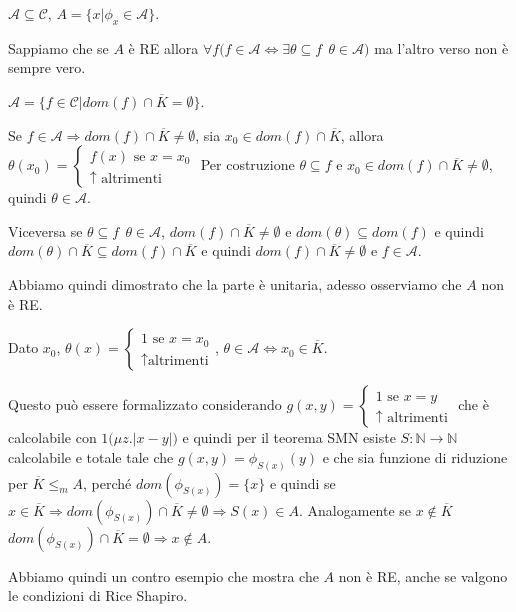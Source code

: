 $\mathcal{A} \subseteq \mathcal{C}$, $A = \{ x | \phi_x \in \mathcal{A} \}$.

Sappiamo che se $A$ è RE allora $\forall f \big( f \in \mathcal{A} \Leftrightarrow \exists \theta \subseteq f \:\: \theta \in \mathcal{A} \big)$ ma l'altro verso non è sempre vero.

$\mathcal{A} = \{ f \in \mathcal{C} | dom(f) \cap \overline{K} = \emptyset \}$.

Se $f \in \mathcal{A} \Rightarrow dom(f) \cap \overline{K} \neq \emptyset$, sia $x_0 \in dom(f) \cap \overline{K}$, allora $\theta(x_0) = \begin{cases}
f(x) \text{ se } x = x_0 \\
\uparrow \text{ altrimenti}
\end{cases}$
Per costruzione $\theta \subseteq f$ e $x_0 \in dom(f) \cap \overline{K} \neq \emptyset$, quindi $\theta \in \mathcal{A}$.

Viceversa se $\theta \subseteq f \: \: \theta \in \mathcal{A}$, $dom(f) \cap \overline{K} \neq \emptyset $ e $dom(\theta) \subseteq dom(f)$ e quindi $dom(\theta) \cap \overline{K} \subseteq dom(f) \cap \overline{K}$ e quindi $dom(f) \cap \overline{K} \neq \emptyset$ e $f \in \mathcal{A}$.

Abbiamo quindi dimostrato che la parte è unitaria, adesso osserviamo che $A$ non è RE.

Dato $x_0$, $\theta(x) = \begin{cases}
1 \text{ se }x = x_0 \\
\uparrow \text{altrimenti}
\end{cases}$, $\theta \in \mathcal{A} \Leftrightarrow x_0 \in \overline{K}$.

Questo può essere formalizzato considerando $g(x,y) = \begin{cases}
1 \text{ se } x= y\\
\uparrow \text{ altrimenti}
\end{cases}$ che è calcolabile con $1\big( \mu z. |x-y|\big)$ e quindi per il teorema SMN esiste $S:\mathbb{N} \rightarrow \mathbb{N}$ calcolabile e totale tale che $g(x,y) = \phi_{S(x)}(y)$ e che sia funzione di riduzione per $\overline{K} \leq_m A$, perché $dom(\phi_{S(x)}) = \{x\}$ e quindi se $x \in \overline{K} \Rightarrow dom(\phi_{S(x)}) \cap \overline{K} \neq \emptyset \Rightarrow S(x) \in A$. Analogamente se $x \notin \overline{K}$ $dom(\phi_{S(x)}) \cap \overline{K} = \emptyset \Rightarrow x \notin A$.

Abbiamo quindi un contro esempio che mostra che $A$ non è RE, anche se valgono le condizioni di Rice Shapiro.